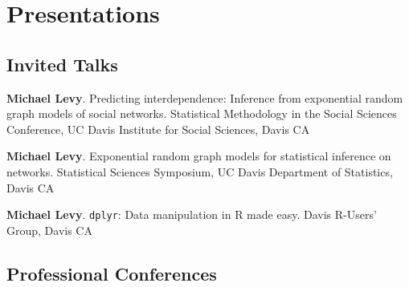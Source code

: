 \section{Presentations}\label{presentations}

\subsection{Invited Talks}\label{invited-talks}

\begin{description}
\tightlist
\item[2015]
\textbf{Michael Levy}. Predicting interdependence: Inference from
exponential random graph models of social networks. Statistical
Methodology in the Social Sciences Conference, UC Davis Institute for
Social Sciences, Davis CA
\item[2015]
\textbf{Michael Levy}. Exponential random graph models for statistical
inference on networks. Statistical Sciences Symposium, UC Davis
Department of Statistics, Davis CA
\item[2014]
\textbf{Michael Levy}. \texttt{dplyr}: Data manipulation in R made easy.
Davis R-Users' Group, Davis CA
\end{description}

\subsection{Professional Conferences}\label{professional-conferences}

